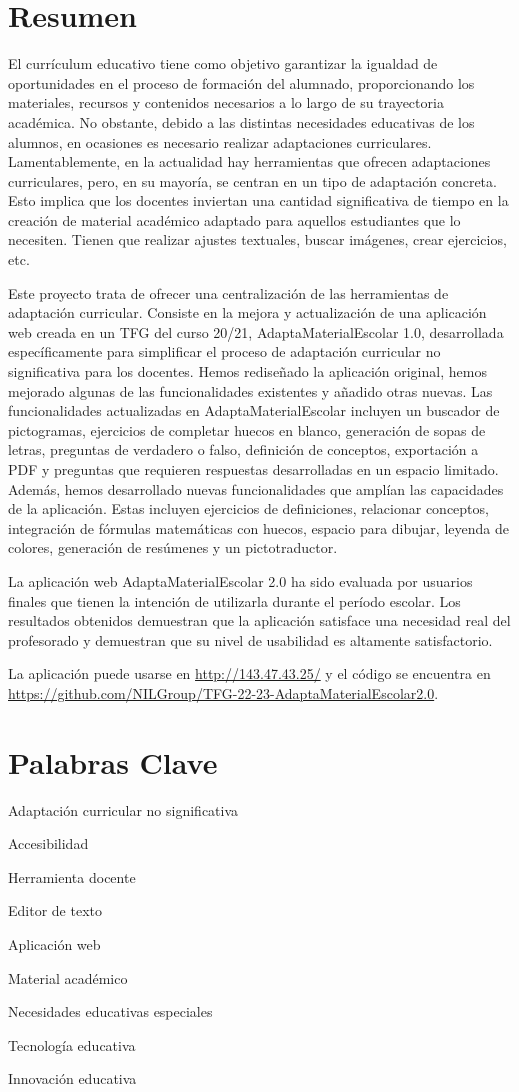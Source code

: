 \chapter{Resumen}

El currículum educativo tiene como objetivo garantizar la igualdad de oportunidades en el proceso de formación del alumnado, proporcionando los materiales, recursos y contenidos necesarios a lo largo de su trayectoria académica. No obstante, debido a las distintas necesidades educativas de los alumnos, en ocasiones es necesario realizar adaptaciones curriculares. Lamentablemente, en la actualidad hay herramientas que ofrecen adaptaciones curriculares, pero, en su mayoría, se centran en un tipo de adaptación concreta. Esto implica que los docentes inviertan una cantidad significativa de tiempo en la creación de material académico adaptado para aquellos estudiantes que lo necesiten. Tienen que realizar ajustes textuales, buscar imágenes, crear ejercicios, etc.

Este proyecto trata de ofrecer una centralización de las herramientas de adaptación curricular. Consiste en la mejora y actualización de una aplicación web creada en un TFG del curso 20/21, AdaptaMaterialEscolar 1.0, desarrollada específicamente para simplificar el proceso de adaptación curricular no significativa para los docentes. Hemos rediseñado la aplicación original, hemos mejorado algunas de las funcionalidades existentes y añadido otras nuevas. Las funcionalidades actualizadas en AdaptaMaterialEscolar incluyen un buscador de pictogramas, ejercicios de completar huecos en blanco, generación de sopas de letras, preguntas de verdadero o falso, definición de conceptos, exportación a PDF y preguntas que requieren respuestas desarrolladas en un espacio limitado. Además, hemos desarrollado nuevas funcionalidades que amplían las capacidades de la aplicación. Estas incluyen ejercicios de definiciones, relacionar conceptos, integración de fórmulas matemáticas con huecos, espacio para dibujar, leyenda de colores, generación de resúmenes y un pictotraductor.

La aplicación web AdaptaMaterialEscolar 2.0 ha sido evaluada por usuarios finales que tienen la intención de utilizarla durante el período escolar. Los resultados obtenidos demuestran que la aplicación satisface una necesidad real del profesorado y demuestran que su nivel de usabilidad es altamente satisfactorio.

La aplicación puede usarse en \url{http://143.47.43.25/} y el código se encuentra en \url{https://github.com/NILGroup/TFG-22-23-AdaptaMaterialEscolar2.0}.

\chapter{Palabras Clave}

Adaptación curricular no significativa

Accesibilidad

Herramienta docente

Editor de texto

Aplicación web

Material académico

Necesidades educativas especiales

Tecnología educativa

Innovación educativa



